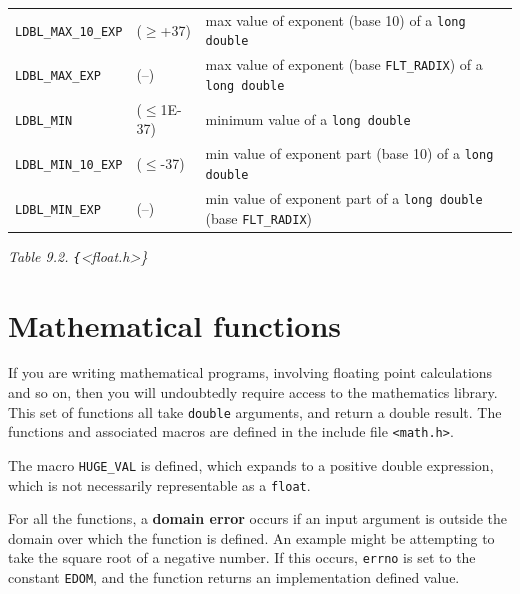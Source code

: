 \begin{tabular}{llp{\textwidth}}
     \texttt{LDBL\_MAX\_10\_EXP} & ($\geq$+37) &  max value of exponent (base 10) of a \texttt{long double}
    \\

     \texttt{LDBL\_MAX\_EXP} & (--) & max value of exponent (base \texttt{FLT\_RADIX}) of a
      \texttt{long double}
    \\

     \texttt{LDBL\_MIN} & ($\leq$1E-37) & minimum value of a \texttt{long double}
    \\

     \texttt{LDBL\_MIN\_10\_EXP} & ($\leq$-37) & min value of exponent part (base 10) of a
      \texttt{long double}
    \\

     \texttt{LDBL\_MIN\_EXP} & (--) & min value of exponent part of a \texttt{long double} (base
      \texttt{FLT\_RADIX})
    \\
\end{tabular}

\begin{center}\textit{Table 9.2. \texttt\{<float.h>\}}\end{center}


  

 
        \section{Mathematical functions}
        

  

  If you are writing mathematical programs, involving floating
   point calculations and so on, then you will undoubtedly
   require access to the mathematics library.  This set of
   functions all take \texttt{double} arguments, and return a double
   result.  The functions and associated macros are defined in
   the include file \texttt{<math.h>}.


  The macro \texttt{HUGE\_VAL} is defined, which expands to a positive
   double expression, which is not necessarily representable as
   a \texttt{float}.


  For all the functions, a \textbf{domain error} occurs if an input
   argument is outside the domain over which the function is
   defined. An example might be attempting to take the square
   root of a negative number. If this occurs, \texttt{errno} is set to
   the constant \texttt{EDOM}, and the function returns an
   implementation defined value.


